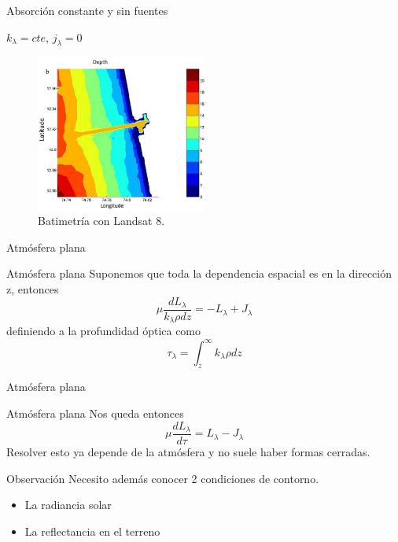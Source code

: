 \documentclass[]{beamer}
\begin{document}
\begin{frame}{Absorción constante y sin fuentes}
  \begin{exampleblock}{$k_\lambda = cte$, $j_\lambda = 0$}
    \begin{figure}
    \centering
    \includegraphics[width=0.5\textwidth]{imagenes/bati.png}
      \caption{Batimetría con Landsat 8.}
    \end{figure}
  \end{exampleblock}
\end{frame}

\begin{frame}{Atmósfera plana}
  \begin{exampleblock}{Atmósfera plana}
    Suponemos que toda la dependencia espacial es en la dirección z, entonces
    \begin{equation}
      \mu \frac{dL_\lambda}{k_\lambda \rho dz} = -L_\lambda + J_\lambda
    \end{equation} \pause
    definiendo a la profundidad óptica como
    \begin{equation}
        \tau_\lambda = \int_z^\infty k_\lambda \rho dz
    \end{equation}
  \end{exampleblock}
\end{frame}

\begin{frame}{Atmósfera plana}
  \begin{exampleblock}{Atmósfera plana}
    Nos queda entonces
    \begin{equation}
      \mu \frac{dL_\lambda}{d\tau} = L_\lambda - J_\lambda
    \end{equation}\pause
    Resolver esto ya depende de la atmósfera y no suele haber formas cerradas.
  \end{exampleblock}
  \pause
  \begin{alertblock}{Observación}
    Necesito además conocer 2 condiciones de contorno.
    \begin{itemize}[<+->]
      \item La radiancia solar
      \item La reflectancia en el terreno
    \end{itemize}
  \end{alertblock}
\end{frame}
\end{document}
